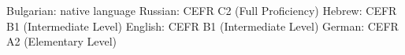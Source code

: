 \cventrytwo
{
Bulgarian: native language
\newline
Russian: CEFR C2 (Full Proficiency)
\newline
Hebrew: CEFR B1 (Intermediate Level)
\newline
English: CEFR B1 (Intermediate Level)
\newline
German: CEFR A2 (Elementary Level)
}